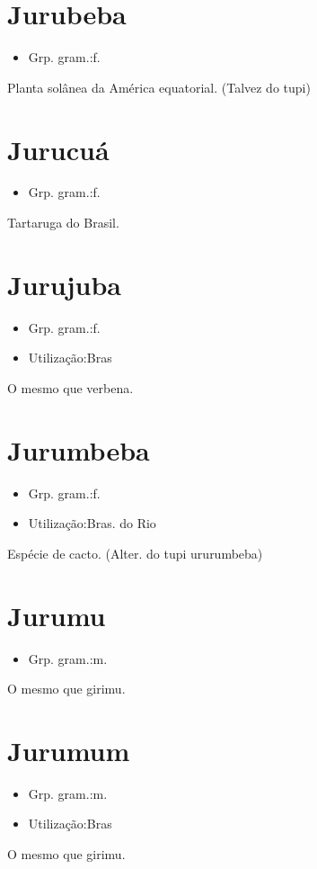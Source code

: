 \documentclass{article}
\begin{document}
\section{Jurubeba}
\begin{itemize}
\item {Grp. gram.:f.}
\end{itemize}
Planta solânea da América equatorial.
(Talvez do tupi)
\section{Jurucuá}
\begin{itemize}
\item {Grp. gram.:f.}
\end{itemize}
Tartaruga do Brasil.
\section{Jurujuba}
\begin{itemize}
\item {Grp. gram.:f.}
\end{itemize}
\begin{itemize}
\item {Utilização:Bras}
\end{itemize}
O mesmo que \textunderscore verbena\textunderscore .
\section{Jurumbeba}
\begin{itemize}
\item {Grp. gram.:f.}
\end{itemize}
\begin{itemize}
\item {Utilização:Bras. do Rio}
\end{itemize}
Espécie de cacto.
(Alter. do tupi \textunderscore ururumbeba\textunderscore )
\section{Jurumu}
\begin{itemize}
\item {Grp. gram.:m.}
\end{itemize}
O mesmo que \textunderscore girimu\textunderscore .
\section{Jurumum}
\begin{itemize}
\item {Grp. gram.:m.}
\end{itemize}
\begin{itemize}
\item {Utilização:Bras}
\end{itemize}
O mesmo que \textunderscore girimu\textunderscore .
\end{document}
